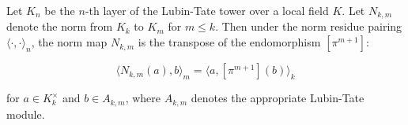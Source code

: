 Let $K_n$ be the $n$-th layer of the Lubin-Tate tower over a local field $K$. Let $N_{k,m}$ denote the norm from $K_k$ to $K_m$ for $m \leq k$. Then under the norm residue pairing $\langle \cdot, \cdot \rangle_n$, the norm map $N_{k,m}$ is the transpose of the endomorphism $[\pi^{m+1}]$:

$$\langle N_{k,m}(a), b \rangle_m = \langle a, [\pi^{m+1}](b) \rangle_k$$

for $a \in K_k^\times$ and $b \in A_{k,m}$, where $A_{k,m}$ denotes the appropriate Lubin-Tate module.
